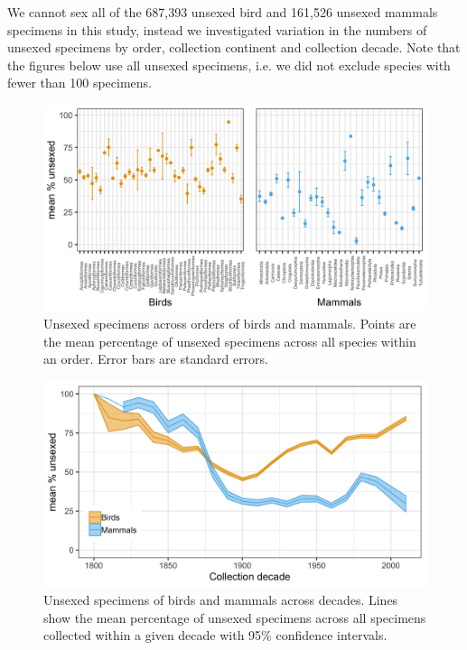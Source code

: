 \documentclass[a4paper, 12pt]{article}
\begin{document}
We cannot sex all of the 687,393 unsexed bird and 161,526 unsexed mammals specimens in this study, instead we investigated variation in the numbers of unsexed specimens by order, collection continent and collection decade. 
Note that the figures below use all unsexed specimens, i.e. we did not exclude species with fewer than 100 specimens.

\begin{figure}[H]
 \centering
  \includegraphics[width = \linewidth]{figures/nosex-orders.png}
  \caption{Unsexed specimens across orders of birds and mammals. 
  Points are the mean percentage of unsexed specimens across all species within an order. 
  Error bars are standard errors.}
  \label{fig-nosex-orders}
\end{figure}

\begin{figure}[H]
 \centering
  \includegraphics[width = \linewidth]{figures/nosex-through-time.png}
  \caption{Unsexed specimens of birds and mammals across decades. 
  Lines show the mean percentage of unsexed specimens across all specimens collected within a given decade with 95\% confidence intervals.}
  \label{fig-nosex-decade}
\end{figure}
\end{document}
